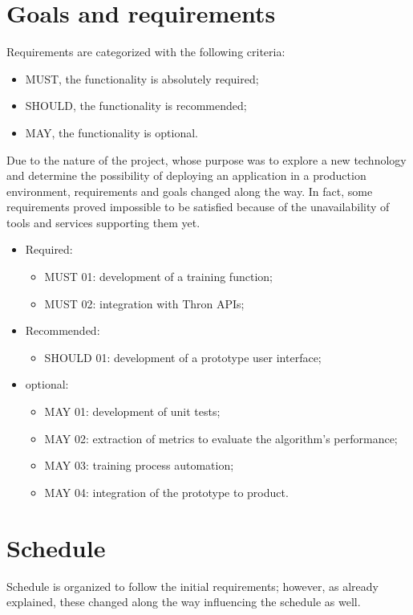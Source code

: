 \section{Goals and requirements}
Requirements are categorized with the following criteria:
\begin{itemize}
	\item MUST, the functionality is absolutely required;
	\item SHOULD, the functionality is recommended;
	\item MAY, the functionality is optional.
\end{itemize}
Due to the nature of the project, whose purpose was to explore a new technology and determine the possibility of deploying an application in a production environment, requirements and goals changed along the way. In fact, some requirements proved impossible to be satisfied because of the unavailability of tools and services supporting them yet.

\begin{itemize}
	\item Required:
	\begin{itemize}
		\item MUST 01: development of a training function;
		\item MUST 02: integration with Thron APIs;
	\end{itemize}
	\item Recommended:
	\begin{itemize}
		\item SHOULD 01: development of a prototype user interface;
	\end{itemize}
	\item optional:
	\begin{itemize}
		\item MAY 01: development of unit tests;
		\item MAY 02: extraction of metrics to evaluate the algorithm's performance;
		\item MAY 03: training process automation;
		\item MAY 04: integration of the prototype to product.
	\end{itemize}
\end{itemize}

\section{Schedule}
Schedule is organized to follow the initial requirements; however, as already explained, these changed along the way influencing the schedule as well.

